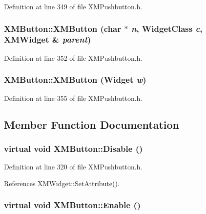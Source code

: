 Definition at line 349 of file XMPushbutton.h.
\subsubsection{\setlength{\rightskip}{0pt plus 5cm}XMButton::XMButton (char $\ast$ {\em n}, Widget\-Class {\em c}, {\bf XMWidget} \& {\em parent})\hspace{0.3cm}{\tt  [inline]}}\label{classXMButton_a6}




Definition at line 352 of file XMPushbutton.h.
\subsubsection{\setlength{\rightskip}{0pt plus 5cm}XMButton::XMButton (Widget {\em w})\hspace{0.3cm}{\tt  [inline]}}\label{classXMButton_a7}




Definition at line 355 of file XMPushbutton.h.

\subsection{Member Function Documentation}
\subsubsection{\setlength{\rightskip}{0pt plus 5cm}virtual void XMButton::Disable ()\hspace{0.3cm}{\tt  [inline, virtual]}}\label{classXMButton_a1}




Definition at line 320 of file XMPushbutton.h.

References XMWidget::Set\-Attribute().
\subsubsection{\setlength{\rightskip}{0pt plus 5cm}virtual void XMButton::Enable ()\hspace{0.3cm}{\tt  [inline, virtual]}}\label{classXMButton_a0}




